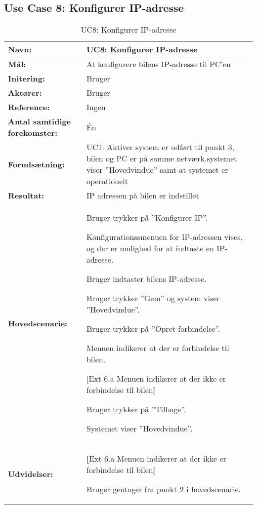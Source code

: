 \subsection{Use Case 8: Konfigurer IP-adresse}
\begin{table}[h]
\begin{tabularx}{\textwidth}{| >{\raggedright\arraybackslash}p{3.3 cm} | >{\raggedright\arraybackslash}X |} \hline

\textbf{Navn:} 						& UC8: Konfigurer IP-adresse										\\ \hline
\textbf{Mål:}						& At konfigurere bilens IP-adresse til PC'en						\\ \hline
\textbf{Initering:}					& Bruger 															\\ \hline
\textbf{Aktører:} 					& Bruger															\\ \hline
\textbf{Reference:} 				& Ingen																\\ \hline
\textbf{Antal samtidige forekomster:} & Én 																\\ \hline
\textbf{Forudsætning:} 				& UC1: Aktiver system er udført til punkt 3, 
									  bilen og PC er på samme netværk,systemet viser ''Hovedvindue'' 
									  samt at systemet er operationelt									\\ \hline
\textbf{Resultat:}					& IP adressen på bilen er indstillet								\\ \hline
\textbf{Hovedscenarie:}				& 

\begin{packed_enum}
	\item Bruger trykker på ''Konfigurer IP''.
	\item Konfigurationssmenuen for IP-adressen vises, og der er mulighed for at indtaste en IP-adresse.
	\item Bruger indtaster bilens IP-adresse.
	\item Bruger trykker ''Gem'' og system viser ''Hovedvindue''.
	\item Bruger trykker på ''Opret forbindelse''.
	\item Menuen indikerer at der er forbindelse til bilen.
	\begin{packed_item}\itemsep1pt \parskip0pt \parsep0pt
		\item {[}Ext 6.a Menuen indikerer at der ikke er forbindelse til bilen{]}
	\end{packed_item}
	\item Bruger trykker på ''Tilbage''.
	\item Systemet viser ''Hovedvindue''.
\end{packed_enum}																						\\ \hline
\textbf{Udvidelser:}				&  
\textbf{[}Ext 6.a Menuen indikerer at der ikke er forbindelse til bilen{]}
	\begin{packed_enum}\itemsep1pt \parskip0pt \parsep0pt
	\item Bruger gentager fra punkt 2 i hovedscenarie. 
	\end{packed_enum}																					\\ \hline
\end{tabularx}
\caption{UC8: Konfigurer IP-adresse}
\label{tbl:UC8}
\end{table}